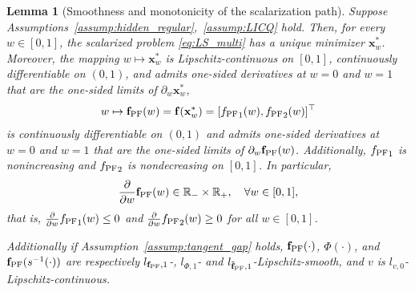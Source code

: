 \documentclass{article}
\newtheorem{lemma}{Lemma}
\newcommand{\bx}{\mathbf{x}}
\newcommand{\R}{\mathbb{R}}
\newcommand{\f}{\mathbf{f}}
\newcommand{\fPF}{{\mathbf{f}_{\rm PF}}}
\newcommand{\Farc}{\Phi}
\begin{document}
\begin{lemma}[Smoothness and monotonicity of the scalarization path]
\label{lem:fPFdifferentiable}
Suppose Assumptions~\ref{assump:hidden_regular},~\ref{assump:LICQ} hold.
Then, for every $w\in[0,1]$, the scalarized problem \eqref{eq:LS_multi} has a unique minimizer $\bx_w^*$.
Moreover, the mapping $w\mapsto \bx_w^*$ is Lipschitz-continuous on $[0,1]$, continuously differentiable on $(0,1)$, and admits one-sided derivatives at $w=0$ and $w=1$ that are the one-sided limits of $\partial_w\bx_w^*$,
\begin{align}
w\mapsto \fPF(w)=\f(\bx_w^*)=[{f_{\rm PF}}_1(w),{f_{\rm PF}}_2(w)]^\top
\end{align}
is continuously differentiable on $(0,1)$ and admits one-sided derivatives at $w=0$ and $w=1$ that are the one-sided limits of $\partial_w\fPF(w)$.
Additionally, ${f_{\rm PF}}_1$ is nonincreasing and ${f_{\rm PF}}_2$ is nondecreasing on $[0,1]$. In particular,
\begin{align}
\frac{\partial}{\partial w}\fPF(w)\in \R_- \times \R_+,
\quad \forall w\in[0,1],
\end{align}
that is, $\frac{\partial}{\partial w}{f_{\rm PF}}_1(w)\le 0$ and $\frac{\partial}{\partial w}{f_{\rm PF}}_2(w)\ge 0$ for all $w\in [0,1]$.

Additionally if Assumption~\ref{assump:tangent_gap} holds, $\fPF(\cdot)$, $\Farc(\cdot)$, and $\fPF(s^{-1}(\cdot))$ are respectively $l_{\fPF,1}$-, $l_{\Farc,1}$- and $l_{\tilde{\mathbf{f}}_{\rm PF},1}$-Lipschitz-smooth, and $v$ is $l_{v,0}$-Lipschitz-continuous.
\end{lemma}
\end{document}
